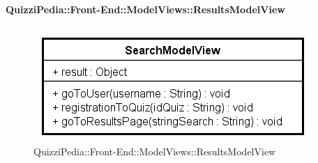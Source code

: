 \paragraph{QuizziPedia::Front-End::ModelViews::ResultsModelView}
	
	\label{QuizziPedia::Front-End::ModelViews::ResultsModelView}
	
	\begin{figure}[ht]
		\centering
		\includegraphics[scale=0.8,keepaspectratio]{UML/Classi/Front-End/QuizziPedia_Front-end_ModelView_SearchModelView.png}
		\caption{QuizziPedia::Front-End::ModelViews::ResultsModelView}
	\end{figure} \FloatBarrier
	

